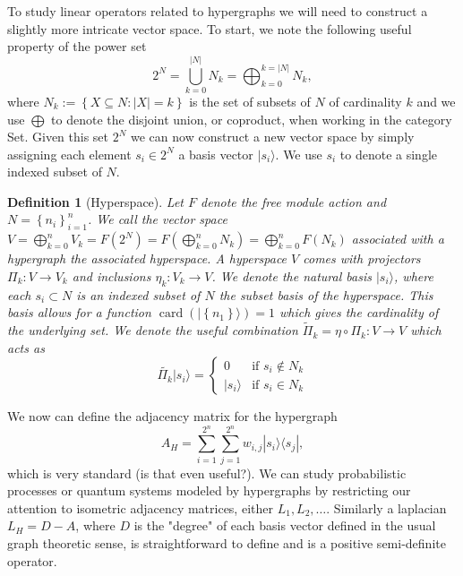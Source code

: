 \documentclass{article}
\newcommand{\ket}[1]{|#1\rangle}
\newcommand{\ketbra}[2]{| #1\rangle\! \langle #2|}
\newcommand{\parens}[1]{\left( #1 \right)}
\newcommand{\set}[1]{\left\{ #1 \right\}}
\DeclareMathOperator{\card}{card}
\newcommand{\cardi}[1]{\card \parens{ #1 }}
\newtheorem{defn}{Definition}
\begin{document}
To study linear operators related to hypergraphs we will need to construct a slightly more intricate vector space. To start, we note the following useful property of the power set 
\begin{equation}
    2^N =  \bigcup_{k=0}^{|N|} N_k = \bigoplus_{k=0}^{k = |N|} N_k,
\end{equation}
where $N_k := \set{X \subseteq N : |X| = k}$ is the set of subsets of $N$ of cardinality $k$ and we use $\bigoplus$ to denote the disjoint union, or coproduct, when working in the category Set. Given this set $2^N$ we can now construct a new vector space by simply assigning each element $s_i \in 2^N$ a basis vector $\ket{s_i}$. We use $s_i$ to denote a single indexed subset of $N$. 

\begin{defn}[Hyperspace]
    Let $F$ denote the free module action and $N = \set{n_i}_{i=1}^n$. We call the vector space $V = \bigoplus_{k=0}^n V_k = F(2^N) = F(\bigoplus_{k=0}^n N_k) = \bigoplus_{k=0}^n F(N_k)$ associated with a hypergraph the associated hyperspace. A hyperspace $V$ comes with projectors $\Pi_k : V \to V_k$ and inclusions $\eta_k : V_k \to V$. We denote the natural basis $\ket{s_i}$, where each $s_i \subset N$ is an indexed subset of $N$ the subset basis of the hyperspace. This basis allows for a function $\cardi{\ket{\set{n_1}}} = 1$ which gives the cardinality of the underlying set. We denote the useful combination $\widetilde{\Pi}_k = \eta \circ \Pi_k : V \to V$ which acts as
    \begin{equation}
        \widetilde{\Pi_k} \ket{s_i} = \begin{cases}
            0 & \text{if } s_i \notin N_k \\
            \ket{s_i} & \text{if } s_i \in N_k 
        \end{cases}
    \end{equation}
\end{defn}

We now can define the adjacency matrix for the hypergraph
\begin{equation}
    A_H = \sum_{i=1}^{2^n} \sum_{j=1}^{2^n} w_{i,j} \ketbra{s_i}{s_j},
\end{equation}
which is very standard (is that even useful?). We can study probabilistic processes or quantum systems modeled by hypergraphs by restricting our attention to isometric adjacency matrices, either $L_1, L_2, \ldots$. 
Similarly a laplacian $L_H = D - A$, where $D$ is the "degree" of each basis vector defined in the usual graph theoretic sense, is straightforward to define and is a positive semi-definite operator. 
\end{document}
